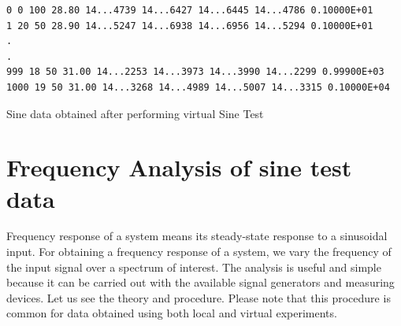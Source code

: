 \begin{table}
\begin{verbatim}
0 0 100 28.80 14...4739 14...6427 14...6445 14...4786 0.10000E+01
1 20 50 28.90 14...5247 14...6938 14...6956 14...5294 0.10000E+01
.
.
999 18 50 31.00 14...2253 14...3973 14...3990 14...2299 0.99900E+03
1000 19 50 31.00 14...3268 14...4989 14...5007 14...3315 0.10000E+04
\end{verbatim}
\caption{Sine data obtained after performing virtual Sine Test}
\label{rampdata}
\end{table}



\section{Frequency Analysis of sine test data}
 Frequency response of a system means its steady-state response to a sinusoidal input. 
 For obtaining a frequency response of a system, we vary the frequency of the input signal over a spectrum of interest. 
 The analysis is useful and simple because it can be carried out with the available signal generators and measuring devices. Let us see the theory and procedure.  Please note that this procedure is common for data obtained using both local and virtual experiments.

